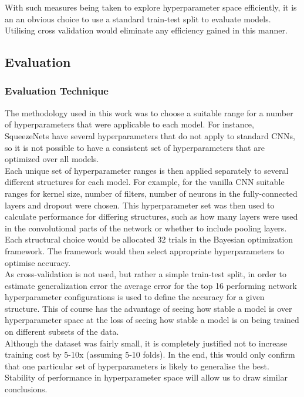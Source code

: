 \documentclass{article}
\begin{document}
{ With such measures being taken to explore hyperparameter space efficiently, it is an an obvious choice to use a standard train-test split to evaluate models. Utilising cross validation would eliminate any efficiency gained in this manner. \\




\subsection{Evaluation}

\subsubsection{Evaluation Technique}
The methodology used in this work was to choose a suitable range for a number of hyperparameters that were applicable to each model. For instance, SqueezeNets have several hyperparameters that do not apply to standard CNNs, so it is not possible to have a consistent set of hyperparameters that are optimized over all  models. \\

Each unique set of hyperparameter ranges is then applied separately to several different structures for each model. For example, for the vanilla CNN suitable ranges for kernel size, number of filters, number of neurons in the fully-connected layers and dropout were chosen. This hyperparameter set was then used to calculate performance for differing structures, such as how many layers were used in the convolutional parts of the network or whether to include pooling layers. \\

Each structural choice would be allocated 32 trials in the Bayesian optimization framework. The framework would then select appropriate hyperparameters to optimise accuracy. \\

As cross-validation is not used, but rather a simple train-test split, in order to estimate generalization error the average error for the top 16 performing network hyperparameter configurations is used to define the accuracy for a given structure. This of course has the advantage of seeing how stable a model is over hyperparameter space at the loss of seeing how stable a model is on being trained on different subsets of the data.\\

Although the dataset was fairly small, it is completely justified not to increase training cost by 5-10x (assuming 5-10 folds). In the end, this would only confirm that one particular set of hyperparameters is likely to generalise the best. Stability of performance in hyperparameter space will allow us to draw similar conclusions.\\

}
\end{document}

